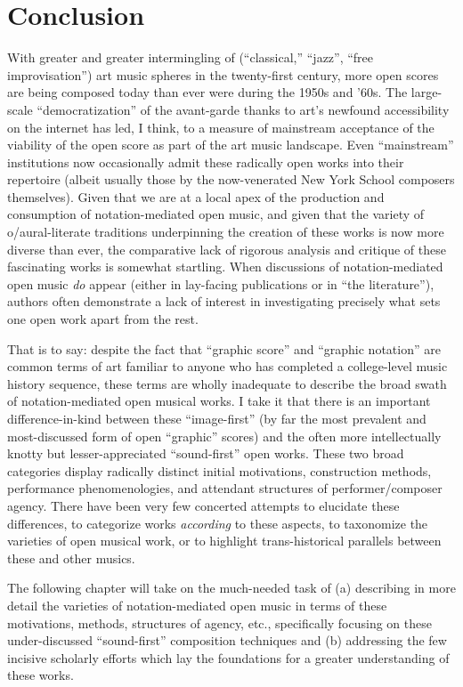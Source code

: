 \section{Conclusion}

    With greater and greater intermingling of (``classical,'' ``jazz'', ``free improvisation'') art music spheres in the twenty-first century, more open scores are being composed today than ever were during the 1950s and '60s. The large-scale ``democratization'' of the avant-garde thanks to art's newfound accessibility on the internet has led, I think, to a measure of mainstream acceptance of the viability of the open score as part of the art music landscape. Even ``mainstream'' institutions now occasionally admit these radically open works into their repertoire (albeit usually those by the now-venerated New York School composers themselves). Given that we are at a local apex of the production and consumption of notation-mediated open music, and given that the variety of o/aural-literate traditions underpinning the creation of these works is now more diverse than ever, the comparative lack of rigorous analysis and critique of these fascinating works is somewhat startling. When discussions of notation-mediated open music \textit{do} appear (either in lay-facing publications or in ``the literature''), authors often demonstrate a lack of interest in investigating precisely what sets one open work apart from the rest. 

    That is to say: despite the fact that ``graphic score'' and ``graphic notation'' are common terms of art familiar to anyone who has completed a college-level music history sequence, these terms are wholly inadequate to describe the broad swath of notation-mediated open musical works. I take it that there is an important difference-in-kind between these ``image-first'' (by far the most prevalent and most-discussed form of open ``graphic'' scores) and the often more intellectually knotty but lesser-appreciated ``sound-first'' open works. These two broad categories display radically distinct initial motivations, construction methods, performance phenomenologies, and attendant structures of performer/composer agency. There have been very few concerted attempts to elucidate these differences, to categorize works \textit{according} to these aspects, to taxonomize the varieties of open musical work, or to highlight trans-historical parallels between these and other musics.

    The following chapter will take on the much-needed task of (a) describing in more detail the varieties of notation-mediated open music in terms of these motivations, methods, structures of agency, etc., specifically focusing on these under-discussed ``sound-first'' composition techniques and (b) addressing the few incisive scholarly efforts which lay the foundations for a greater understanding of these works.


